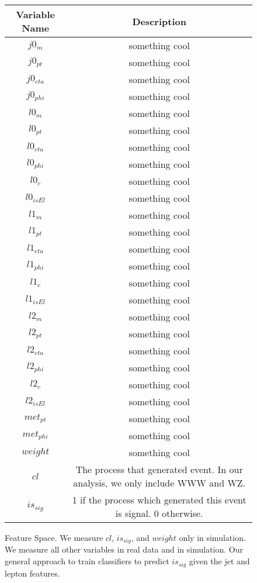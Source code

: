 \documentclass[11pt]{article}
\begin{document}
\begin{figure}
\begin{center}
\begin{tabular}{|c|c|}

  \hline
  Variable Name & Description  \\
 \hline
 \hline
$ j0_m $ & something cool\\
\hline
$ j0_{pt} $ & something cool\\
\hline
$ j0_{eta} $ & something cool\\
\hline
$ j0_{phi} $ & something cool\\
\hline
$ l0_m $ & something cool\\
\hline
$ l0_{pt} $ & something cool\\
\hline
$ l0_{eta} $ & something cool\\
\hline
$ l0_{phi} $ & something cool\\
\hline
$ l0_c $ & something cool\\
\hline
$ l0_{isEl} $ & something cool\\
\hline
$ l1_m $ & something cool\\
\hline
$ l1_{pt} $ & something cool\\
\hline
$ l1_{eta} $ & something cool\\
\hline
$ l1_{phi} $ & something cool\\
\hline
$ l1_c $ & something cool\\
\hline
$ l1_{isEl} $ & something cool\\
\hline
$ l2_m $ & something cool\\
\hline
$ l2_{pt} $ & something cool\\
\hline
$ l2_{eta} $ & something cool\\
\hline
$ l2_{phi} $ & something cool\\
\hline
$ l2_c $ & something cool\\
\hline
$ l2_{isEl} $ & something cool\\
\hline
$ met_{pt} $ & something cool\\
\hline
$ met_{phi} $ & something cool\\
\hline
$ weight $ & something cool\\
\hline
$ cl $ & The process that generated event. In our analysis, we only include WWW and WZ.\\
\hline
$ is_{sig} $ & 1 if the process which generated this event is signal. 0 otherwise.\\
\hline
\end{tabular}
\caption{Feature Space. We measure $cl$, $is_{sig}$, and $weight$ only in simulation. We measure all other variables in real data and in simulation. Our general approach to train classifiers to predict $is_{sig}$ given the jet and lepton features.}
\label{data}
\end{center}
\end{figure}
\end{document}
